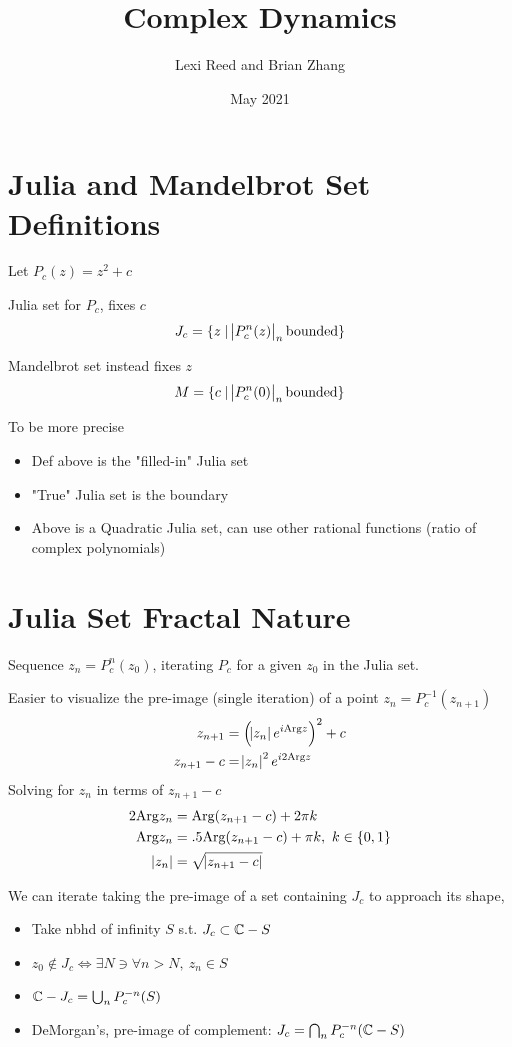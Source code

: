 \documentclass{article}
\title{Complex Dynamics}
\author{Lexi Reed and Brian Zhang}
\date{May 2021}
\begin{document}
\maketitle

\section{Julia and Mandelbrot Set Definitions}

Let $P_c(z) = z^2 + c$

Julia set for $P_c$, fixes $c$
\[ J_c = \{ z \mid  \abs{ P_c^n(z) }_n \textrm{bounded} \} \] 


Mandelbrot set instead fixes $z$
\[ M = \{ c \mid \abs{ P_c^n(0) }_n \textrm{bounded} \} \]

To be more precise
\begin{itemize}
    \item Def above is the "filled-in" Julia set
    \item "True" Julia set is the boundary
    \item Above is a Quadratic Julia set, can use other rational functions (ratio of complex polynomials)
\end{itemize}


\section{Julia Set Fractal Nature}

Sequence $z_n = P_c^n(z_0)$, iterating $P_c$ for a given $z_0$ in the Julia set.

Easier to visualize the pre-image (single iteration) of a point $z_n = P_c^{-1}(z_{n + 1})$
\begin{align*}
    z_{n + 1} &= \left( \abs{z_n}e^{i\text{Arg}{z}}\right)^2 + c \\
    z_{n + 1} - c &= \abs{z_n}^2e^{i2\text{Arg}{z}}
\end{align*}
Solving for $z_n$ in terms of $z_{n+1} - c$
\begin{align*}
    2\text{Arg}{z_n} &= \text{Arg}(z_{n+1} - c) + 2\pi k \\
    \text{Arg}{z_n} &= .5 \text{Arg}(z_{n+1} - c) + \pi k,\ k \in \{0, 1\} \\
    \abs{z_n} &= \sqrt{\abs{z_{n+1} - c}}
\end{align*}

We can iterate taking the pre-image of a set containing $J_c$ to approach its shape,
\begin{itemize}
    \item Take nbhd of infinity $S$ s.t. $J_c \subset \mathbb{C} - S$
    \item $z_0 \not \in J_c \iff \exists N \ni \forall n > N,\ z_n \in S$
    \item $\mathbb{C} - J_c = \bigcup_n P_c^{-n}(S)$
    \item DeMorgan's, pre-image of complement: $J_c = \bigcap_n P_c^{-n}(\mathbb{C} - S)$
\end{itemize}
\end{document}
